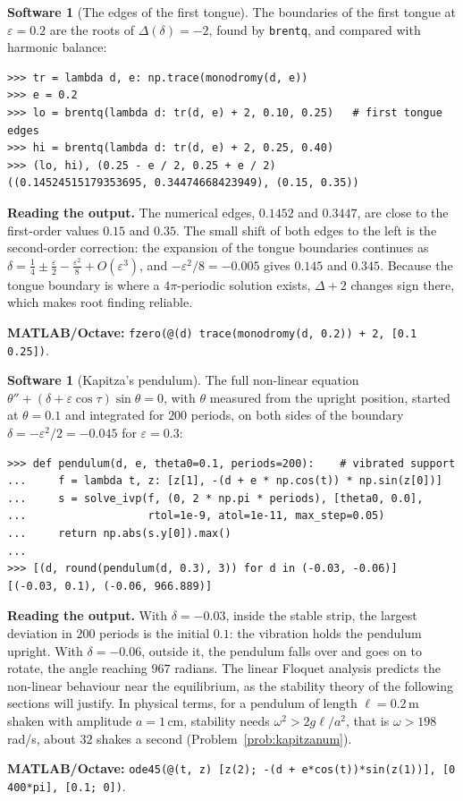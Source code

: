 \documentclass[11pt,a4paper]{article}
\numberwithin{equation}{section}
\theoremstyle{definition}
\newtheorem{software}[thm]{Software}
\begin{document}
\begin{software}[The edges of the first tongue]
\label{sw:tongue}
The boundaries of the first tongue at $\varepsilon = 0.2$ are the roots of $\Delta(\delta) = -2$, found by \texttt{brentq}, and compared with harmonic balance:
{\small\begin{verbatim}
>>> tr = lambda d, e: np.trace(monodromy(d, e))
>>> e = 0.2
>>> lo = brentq(lambda d: tr(d, e) + 2, 0.10, 0.25)   # first tongue edges
>>> hi = brentq(lambda d: tr(d, e) + 2, 0.25, 0.40)
>>> (lo, hi), (0.25 - e / 2, 0.25 + e / 2)
((0.14524515179353695, 0.34474668423949), (0.15, 0.35))
\end{verbatim}}
\textbf{Reading the output.} The numerical edges, $0.1452$ and $0.3447$, are close to the first-order values $0.15$ and $0.35$. The small shift of both edges to the left is the second-order
correction: the expansion of the tongue boundaries continues as $\delta = \frac14 \pm \frac\varepsilon2 - \frac{\varepsilon^2}{8} + O(\varepsilon^3)$, and $-\varepsilon^2/8 = -0.005$ gives $0.145$ and $0.345$. Because the tongue boundary is where a $4\pi$-periodic solution exists, $\Delta + 2$ changes sign there, which makes root finding
reliable.

\textbf{MATLAB/Octave:} \texttt{fzero(@(d) trace(monodromy(d, 0.2)) + 2, [0.1 0.25])}.
\end{software}

\begin{software}[Kapitza's pendulum]
\label{sw:kapitza}
The full non-linear equation $\theta'' + (\delta + \varepsilon\cos\tau)\sin\theta = 0$, with $\theta$ measured from the upright position, started at $\theta = 0.1$ and integrated for $200$ periods, on both sides of the
boundary $\delta = -\varepsilon^2/2 = -0.045$ for $\varepsilon = 0.3$:
{\small\begin{verbatim}
>>> def pendulum(d, e, theta0=0.1, periods=200):    # vibrated support
...     f = lambda t, z: [z[1], -(d + e * np.cos(t)) * np.sin(z[0])]
...     s = solve_ivp(f, (0, 2 * np.pi * periods), [theta0, 0.0],
...                   rtol=1e-9, atol=1e-11, max_step=0.05)
...     return np.abs(s.y[0]).max()
...
>>> [(d, round(pendulum(d, 0.3), 3)) for d in (-0.03, -0.06)]
[(-0.03, 0.1), (-0.06, 966.889)]
\end{verbatim}}
\textbf{Reading the output.} With $\delta = -0.03$, inside the stable strip, the largest deviation in $200$ periods is the initial $0.1$: the vibration holds the pendulum upright. With $\delta = -0.06$, outside it, the
pendulum falls over and goes on to rotate, the angle reaching $967$ radians. The linear Floquet analysis predicts the non-linear behaviour near the equilibrium, as the stability
theory of the following sections will justify. In physical terms, for a pendulum of length $\ell = 0.2$\,m shaken with amplitude $a = 1$\,cm, stability needs $\omega^2 > 2g\ell/a^2$, that is $\omega > 198$\,rad/s, about
$32$ shakes a second (Problem~\ref{prob:kapitzanum}).

\textbf{MATLAB/Octave:} \texttt{ode45(@(t, z) [z(2); -(d + e*cos(t))*sin(z(1))], [0 400*pi], [0.1; 0])}.
\end{software}
\end{document}
